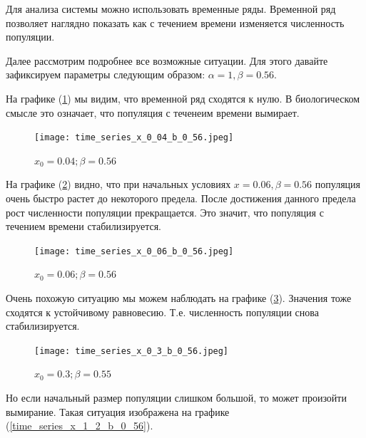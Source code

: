         Для анализа системы можно использовать временные ряды. Временной ряд позволяет наглядно показать как с течением времени изменяется численность популяции.

        Далее рассмотрим подробнее все возможные ситуации. Для этого давайте зафиксируем параметры следующим образом: \(\alpha = 1, \beta = 0.56\). 

        На графике (\ref{time_series_x_0_04_b_0_56}) мы видим, что временной ряд сходятся к нулю. В биологическом смысле это означает, что популяция с теченеим времени вымирает.
    
        \begin{figure}[h!]
            \centering
            \texttt{[image: time\_series\_x\_0\_04\_b\_0\_56.jpeg]}

            \captionsetup{justification=centering}
            \caption{\(x_0 = 0.04; \beta = 0.56\)}
            \label{time_series_x_0_04_b_0_56}
        \end{figure}

        На графике (\ref{time_series_x_0_06_b_0_56}) видно, что при начальных условиях \(x = 0.06, \beta = 0.56\) популяция очень быстро растет до некоторого предела. После достижения данного предела рост численности популяции прекращается. Это значит, что популяция с течением времени стабилизируется.
    
        \begin{figure}[h!]
            \centering
            \texttt{[image: time\_series\_x\_0\_06\_b\_0\_56.jpeg]}

            \captionsetup{justification=centering}
            \caption{\(x_0 = 0.06; \beta = 0.56\)}
            \label{time_series_x_0_06_b_0_56}
        \end{figure}

        Очень похожую ситуацию мы можем наблюдать на графике (\ref{time_series_x_0_3_b_0_56}). Значения тоже сходятся к устойчивому равновесию. Т.е. численность популяции снова стабилизируется.
    
        \begin{figure}[h!]
            \centering
            \texttt{[image: time\_series\_x\_0\_3\_b\_0\_56.jpeg]}

            \captionsetup{justification=centering}
            \caption{\(x_0 = 0.3; \beta = 0.55\)}
            \label{time_series_x_0_3_b_0_56}
        \end{figure}

        Но если начальный размер популяции слишком большой, то может произойти вымирание. Такая ситуация изображена на графике (\ref{time_series_x_1_2_b_0_56}).
    
